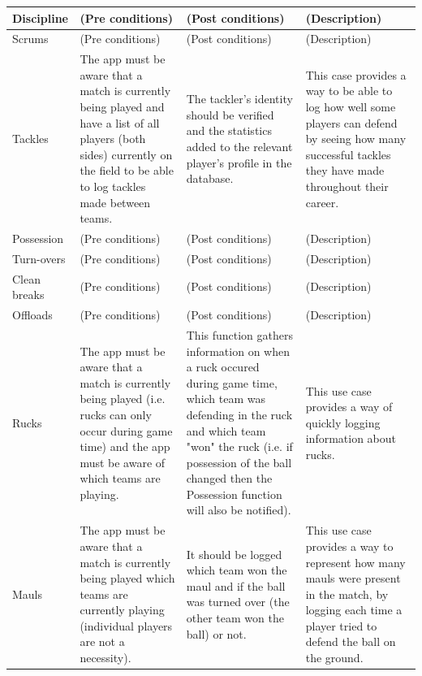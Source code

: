 \documentclass[a4paper,12pt]{report}
\begin{document}
\begin{center}
\begin{longtable}{| p{3cm} | p{4cm} | p{4cm} | p{4cm} |}
    Discipline & (Pre conditions) & (Post conditions) & (Description)\\ \hline
    Scrums & (Pre conditions) & (Post conditions) & (Description)\\ \hline
    Tackles & The app must be aware that a match is currently being played and have a list of all players (both sides) currently on the field to be able to log tackles made between teams. & The tackler's identity should be verified and the statistics added to the relevant player's profile in the database. & This case provides a way to be able to log how well some players can defend by seeing how many successful tackles they have made throughout their career.\\ \hline
    Possession & (Pre conditions) & (Post conditions) & (Description)\\ \hline
    Turn-overs & (Pre conditions) & (Post conditions) & (Description)\\ \hline
    Clean breaks & (Pre conditions) & (Post conditions) & (Description)\\ \hline
    Offloads & (Pre conditions) & (Post conditions) & (Description)\\ \hline
    Rucks & The app must be aware that a match is currently being played (i.e. rucks can only occur during game time) and the app must be aware of which teams are playing. & This function gathers information on when a ruck occured during game time, which team was defending in the ruck and which team "won" the ruck (i.e. if possession of the ball changed then the Possession function will also be notified). & This use case provides a way of quickly logging information about rucks.\\ \hline
    Mauls & The app must be aware that a match is currently being played which teams are currently playing (individual players are not a necessity). & It should be logged which team won the maul and if the ball was turned over (the other team won the ball) or not. & This use case provides a way to represent how many mauls were present in the match, by logging each time a player tried to defend the ball on the ground.\\ \hline

    \hline
  \end{longtable}
\end{center}
\newpage
\end{document}
